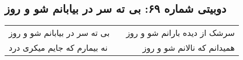 \begin{center}
\section*{دوبیتی شماره ۶۹: بی ته سر در بیابانم شو و روز}
\label{sec:069}
\begin{longtable}{l p{0.5cm} r}
بی ته سر در بیابانم شو و روز
&&
سرشک از دیده بارانم شو و روز
\\
نه بیمارم که جایم میکری درد
&&
همیدانم که نالانم شو و روز
\\
\end{longtable}
\end{center}
